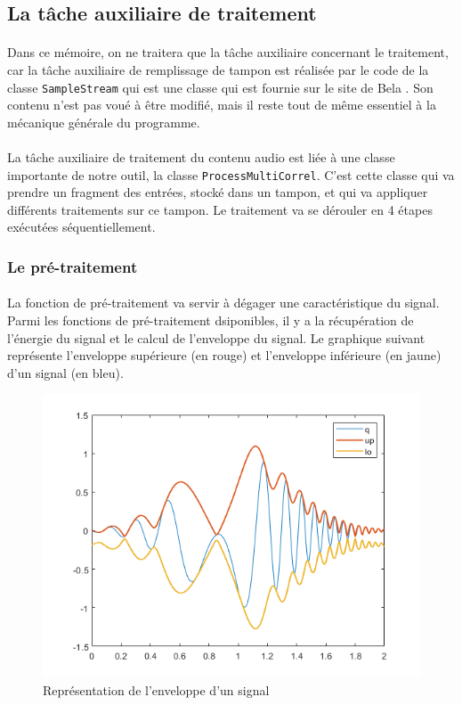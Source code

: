 \subsection{La tâche auxiliaire de traitement}
\paragraph{}
Dans ce mémoire, on ne traitera que la tâche auxiliaire concernant le traitement, car la tâche auxiliaire de remplissage de tampon est réalisée par le code de la classe \verb!SampleStream! qui est une classe qui est fournie sur le site de Bela \cite{BELA}. Son contenu n'est pas voué à être modifié, mais il reste tout de même essentiel à la mécanique générale du programme.
\paragraph{}
La tâche auxiliaire de traitement du contenu audio est liée à une classe importante de notre outil, la classe \verb!ProcessMultiCorrel!. C'est cette classe qui va prendre un fragment des entrées, stocké dans un tampon, et qui va appliquer différents traitements sur ce tampon. Le traitement va se dérouler en 4 étapes exécutées séquentiellement.
\subsubsection{Le pré-traitement}
\paragraph{}
La fonction de pré-traitement va servir à dégager une caractéristique du signal. Parmi les fonctions de pré-traitement dsiponibles, il y a la récupération de l'énergie du signal et le calcul de l'enveloppe du signal. Le graphique suivant représente l'enveloppe supérieure (en rouge) et l'enveloppe inférieure (en jaune) d'un signal (en bleu). \cite{ENV}
\begin{figure}[H]
    \centering
    \includegraphics[scale=0.6]{assets/signal-enveloppe.png}
    \caption{Représentation de l'enveloppe d'un signal}
    \label{enveloppe signal}
\end{figure}
